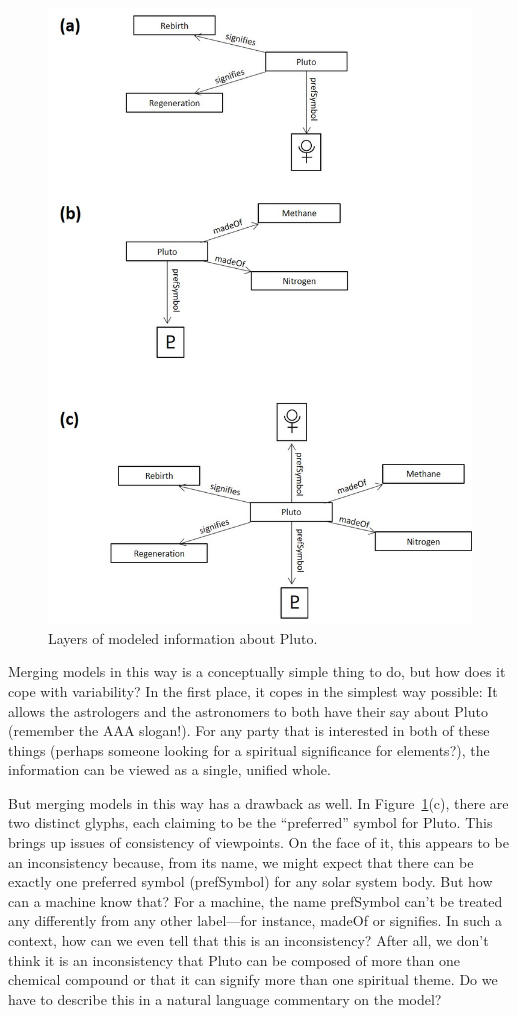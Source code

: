 \begin{figure}
    \centering
    \includegraphics[width=5.0in]{SWWOv3/media/ch2/f02-03abc.jpg}
    \caption{Layers of modeled information about Pluto.}
    \label{fig:ch2.3}
\end{figure}

Merging models in this way is a conceptually simple thing to do, but how
does it cope with variability? In the first place, it copes in the
simplest way possible: It allows the astrologers and the astronomers to
both have their say about Pluto (remember the AAA slogan!). For any
party that is interested in both of these things (perhaps someone
looking for a spiritual significance for elements?), the information can
be viewed as a single, unified whole.

But merging models in this way has a drawback as well. In Figure~\ref{fig:ch2.3}(c),
there are two distinct glyphs, each claiming to be the ``preferred''
symbol for Pluto. This brings up issues of consistency of viewpoints. On
the face of it, this appears to be an inconsistency because, from its
name, we might expect that there can be exactly one preferred symbol
(prefSymbol) for any solar system body. But how can a machine know that?
For a machine, the name prefSymbol can't be treated any differently from
any other label---for instance, madeOf or signifies. In such a context,
how can we even tell that this is an inconsistency? After all, we don't
think it is an inconsistency that Pluto can be composed of more than one
chemical compound or that it can signify more than one spiritual theme.
Do we have to describe this in a natural language commentary on the
model?

